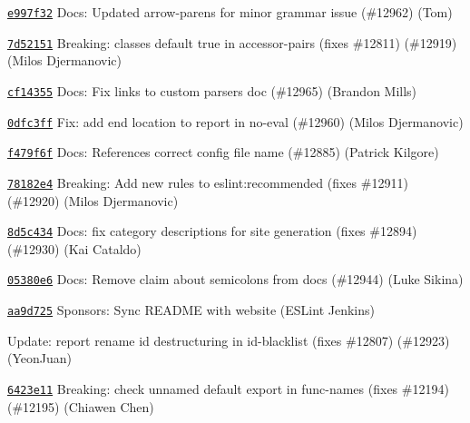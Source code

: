 \begin{DoxyItemize}
\item \href{https://github.com/eslint/eslint/commit/e997f32b936463ac38e8b0034f764c47502e56a8}{\texttt{ {\ttfamily e997f32}}} Docs\+: Updated arrow-\/parens for minor grammar issue (\#12962) (Tom)
\item \href{https://github.com/eslint/eslint/commit/7d52151bcd5d5524f240588436a8808162be187f}{\texttt{ {\ttfamily 7d52151}}} Breaking\+: classes default {\ttfamily true} in accessor-\/pairs (fixes \#12811) (\#12919) (Milos Djermanovic)
\item \href{https://github.com/eslint/eslint/commit/cf14355e34a6757e15806f8e493553bd7110fb36}{\texttt{ {\ttfamily cf14355}}} Docs\+: Fix links to custom parsers doc (\#12965) (Brandon Mills)
\item \href{https://github.com/eslint/eslint/commit/0dfc3ff9fb228e1d9b1df99de50033ce9140ac24}{\texttt{ {\ttfamily 0dfc3ff}}} Fix\+: add end location to report in no-\/eval (\#12960) (Milos Djermanovic)
\item \href{https://github.com/eslint/eslint/commit/f479f6fe2eb95156e22bebfccb39a7fc1f19e9c0}{\texttt{ {\ttfamily f479f6f}}} Docs\+: References correct config file name (\#12885) (Patrick Kilgore)
\item \href{https://github.com/eslint/eslint/commit/78182e45e0178d9eac2591944ef4daee21d2cb44}{\texttt{ {\ttfamily 78182e4}}} Breaking\+: Add new rules to eslint\+:recommended (fixes \#12911) (\#12920) (Milos Djermanovic)
\item \href{https://github.com/eslint/eslint/commit/8d5c434f721142be74c7515aaa935668a15b79b1}{\texttt{ {\ttfamily 8d5c434}}} Docs\+: fix category descriptions for site generation (fixes \#12894) (\#12930) (Kai Cataldo)
\item \href{https://github.com/eslint/eslint/commit/05380e6e7e19a79d26ea6d6b44a8d5ee7cde51c8}{\texttt{ {\ttfamily 05380e6}}} Docs\+: Remove claim about semicolons from docs (\#12944) (Luke Sikina)
\item \href{https://github.com/eslint/eslint/commit/aa9d72525054e641231a2960a2e37b3716228056}{\texttt{ {\ttfamily aa9d725}}} Sponsors\+: Sync README with website (ESLint Jenkins)
\item \href{https://github.com/eslint/eslint/commit/7747177f8504961059b7c56bdb70a820bd1114c1}{\texttt{ {}}} Update\+: report rename id destructuring in id-\/blacklist (fixes \#12807) (\#12923) (Yeon\+Juan)
\item \href{https://github.com/eslint/eslint/commit/6423e11c0bedd3b4e661ab554316bdeb1fc1ee3c}{\texttt{ {\ttfamily 6423e11}}} Breaking\+: check unnamed default export in func-\/names (fixes \#12194) (\#12195) (Chiawen Chen)

\end{DoxyItemize}
